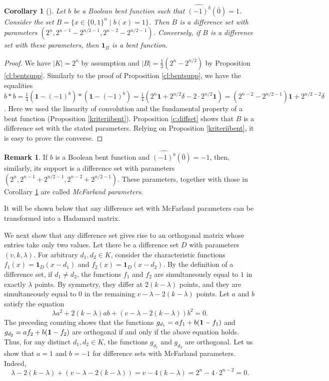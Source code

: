 \documentclass[11pt]{article}
\newtheorem{corollary}{Corollary}[section]
\theoremstyle{definition}
\newtheorem{remark}{Remark}[section]
\begin{document}
{{{\begin{corollary}[\cite{Mesnager}]\label{cor:bent_diffset} Let $b$ be a Boolean bent function such that $\widehat{(-1)^b}(\bar0)=1$.
Consider the set $B=\{x\in\{0,1\}^n\mid b(x)=1 \}$. Then
$B$ is a difference set with parameters
$(2^n,2^{n-1}-2^{n/2-1},2^{n-2}-2^{n/2-1})$. Conversely, if
$B$ is a difference set with these parameters, then ${\mathbf 1}_{B}$
is a bent function.
\end{corollary}
\begin{proof}
We have $|K|=2^n$ by assumption and $|B|=\frac12(2^n-2^{n/2})$ by
Proposition \ref{cl:bentsupp}. Similarly to the proof of Proposition
\ref{cl:bentsupp}, we have the equalities
$b*b=\frac14(\mathbf{1}-(-1)^b)*(\mathbf{1}-(-1)^b)=\frac14(2^n\mathbf{1}+2^{n/2}\delta-
2\cdot2^{n/2}\mathbf{1})=(2^{n-2}-2^{n/2-1})\mathbf{1}+2^{n/2-2}\delta$.
Here we used the linearity of convolution and the fundamental property of a
bent function (Proposition \ref{kriteriibent}).  Proposition
\ref{c:diffset} 
shows that $B$ is a difference set with the stated parameters.
Relying on Proposition
\ref{kriteriibent}, it is easy to prove the converse.
\end{proof}

\begin{remark}
If $b$ is a Boolean bent function and $\widehat{(-1)^b}(\bar0)=-1$, then,
 similarly,  its support is a difference set
with parameters $(2^n,2^{n-1}+2^{n/2-1},2^{n-2}+2^{n/2-1})$. These  parameters, together with those in Corollary \ref{cor:bent_diffset} are called {\sl McFarland parameters}.
\end{remark}
It will be shown below that any difference set with McFarland parameters can be transformed into a Hadamard matrix.

We next show that any difference set gives rise to an orthogonal matrix whose entries take only two values.
 Let there be a difference set $D$
with parameters $(v,k,\lambda)$. For arbitrary $d_1,d_2\in K$, consider the characteristic functions
$f_1(x)={\mathbf 1}_{D}(x-d_1)$ and $f_2(x)={\mathbf 1}_{D}(x-d_2)$. By the definition of a difference set, if $d_1\neq d_2$,
the functions $f_1$ and $f_2$ are simultaneously equal to $1$ in exactly
$\lambda$ points. By symmetry, they differ at $2(k-\lambda)$
points, and they are simultaneously equal to $0$ in the remaining
$v-\lambda-2(k-\lambda)$ points. Let $a$ and $b$ satisfy
the equation
\[
\lambda a^2+2(k-\lambda)ab+(v-\lambda-2(k-\lambda))b^2=0.
\]
The preceding counting shows that the functions $g_{d_1}=af_1+b({\bf
1}-f_1)$ and $g_{d_2}=af_2+b({\bf 1}-f_2)$  are orthogonal if and only if the above equation holds. Thus,
for any distinct $d_1,d_2\in K$, the functions $g_{d_1}$ and
$g_{d_2}$ are orthogonal.  Let us show that $a=1$ and $b=-1$ for difference
sets with McFarland parameters. Indeed,
\[
\lambda -2(k-\lambda)+(v-\lambda-2(k-\lambda))=v-4(k-\lambda)=
2^n-4\cdot2^{n-2}=0.
\]

}}}
\end{document}
